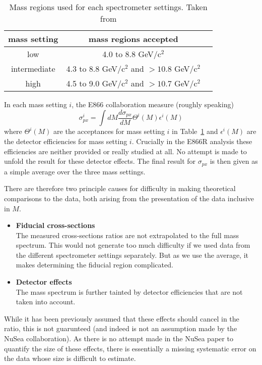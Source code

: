 \documentclass[11pt]{article}
\newcommand{\be}{\begin{equation}}
\newcommand{\ee}{\end{equation}}
\begin{document}
\begin{table}[!h]
\begin{center}                                                          
\begin{tabular}{ccc}               
 mass setting	 & mass regions accepted    \\ \hline
 low	      & 4.0 to 8.8 \rm{GeV/c$^2$}   \\ 
 intermediate         & 4.3 to 8.8 \rm{GeV/c$^2$} and $> 10.8$ \rm{GeV/c$^2$}   \\
 high  	      & 4.5 to 9.0 \rm{GeV/c$^2$} and $> 10.7$ \rm{GeV/c$^2$} \\
\end{tabular}
\caption{Mass regions used for each spectrometer settings. Taken from \cite{Towell:2001nh}}
\label{tab:massregions}   
\end{center}
\end{table}

In each mass setting $i$, the E866 collaboration measure (roughly speaking)
\be \sigma^i_{px} = \int dM \frac{d\sigma_{px}}{dM} \Theta^i(M)\epsilon^i(M) \ee
where $\Theta^i(M)$ are the acceptances for mass setting $i$ in Table~\ref{tab:massregions} and
$\epsilon^i(M)$ are the detector efficiencies for mass setting $i$. Crucially in the E866R analysis
these efficiencies are neither provided or really studied at all. No attempt is made to unfold the result for
these detector effects. The final result for $\sigma_{px}$ is then given as a simple average over
the three mass settings.

There are therefore two principle causes for difficulty in making theoretical comparisons to the data, both arising from the presentation of the data inclusive in $M$.
\begin{itemize}
	\item \textbf{Fiducial cross-sections} \\
		The measured cross-sections ratios are not extrapolated to the full mass spectrum.
		This would not generate too much difficulty if we used data from the different spectrometer
		settings separately. But as we use the average, it makes determining the fiducial region complicated.
	\item \textbf{Detector effects} \\
		The mass spectrum is further tainted by detector efficiencies that are not taken into account.
\end{itemize}


While it has been previously assumed that these effects should cancel in the ratio, this is not guarunteed (and indeed is
not an assumption made by the NuSea collaboration). As there is no attempt made in the NuSea paper to quantify the size of these effects, 
there is essentially a missing systematic error on the data whose size is difficult to estimate.
\end{document}
